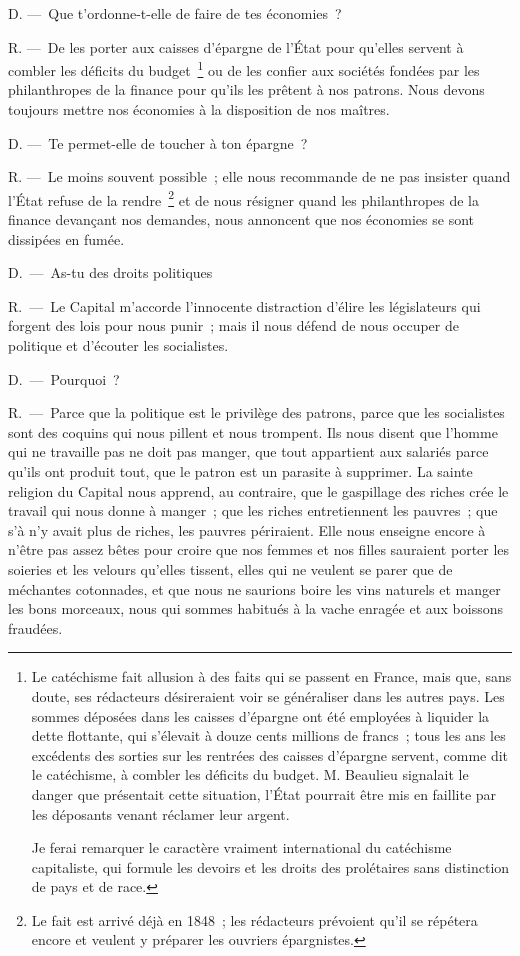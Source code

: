\documentclass[french,twoside]{book} %
\begin{document}
D. — Que t’ordonne-t-elle de faire de tes économies ?\par
R. — De les porter aux caisses d’épargne de l’État pour qu’elles servent à combler les déficits du budget \footnote{ \noindent Le catéchisme fait allusion à des faits qui se passent en France, mais que, sans doute, ses rédacteurs désireraient voir se généraliser dans les autres pays. Les sommes déposées dans les caisses d’épargne ont été employées à liquider la dette flottante, qui s’élevait à douze cents millions de francs ; tous les ans les excédents des sorties sur les rentrées des caisses d’épargne servent, comme dit le catéchisme, à combler les déficits du budget. M. Beaulieu signalait le danger que présentait cette situation, l’État pourrait être mis en faillite par les déposants venant réclamer leur argent.\par
 Je ferai remarquer le caractère vraiment international du catéchisme capitaliste, qui formule les devoirs et les droits des prolétaires sans distinction de pays et de race.
} ou de les confier aux sociétés fondées par les philanthropes de la finance pour qu’ils les prêtent à nos patrons. Nous devons toujours mettre nos économies à la disposition de nos maîtres.\par
D. — Te permet-elle de toucher à ton épargne ?\par
R. — Le moins souvent possible ; elle nous recommande de ne pas insister quand l’État refuse de la rendre \footnote{Le fait est arrivé déjà en 1848 ; les rédacteurs prévoient qu’il se répétera encore et veulent y préparer les ouvriers épargnistes.} et de nous résigner quand les philanthropes de la finance devançant nos demandes, nous annoncent que nos économies se sont dissipées en fumée.\par
D. — As-tu des droits politiques\par
R. — Le Capital m’accorde l’innocente distraction d’élire les législateurs qui forgent des lois pour nous punir ; mais il nous défend de nous occuper de politique et d’écouter les socialistes.\par
D. — Pourquoi ?\par
R. — Parce que la politique est le privilège des patrons, parce que les socialistes sont des coquins qui nous pillent et nous trompent. Ils nous disent que l’homme qui ne travaille pas ne doit pas manger, que tout appartient aux salariés parce qu’ils ont produit tout, que le patron est un parasite à supprimer. La sainte religion du Capital nous apprend, au contraire, que le gaspillage des riches crée le travail qui nous donne à manger ; que les riches entretiennent les pauvres ; que s’à n’y avait plus de riches, les pauvres périraient. Elle nous enseigne encore à n’être pas assez bêtes pour croire que nos femmes et nos filles sauraient porter les soieries et les velours qu’elles tissent, elles qui ne veulent se parer que de méchantes cotonnades, et que nous ne saurions boire les vins naturels et manger les bons morceaux, nous qui sommes habitués à la vache enragée et aux boissons fraudées.\par
\end{document}
